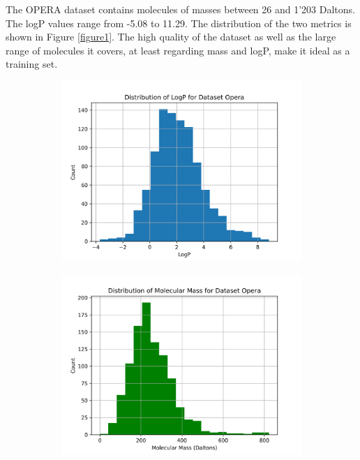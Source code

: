\documentclass{article}
\theoremstyle{definition}
\theoremstyle{remark}
\begin{document}
The OPERA dataset contains molecules of masses between 26 and 1'203 Daltons. The logP values range from -5.08 to 11.29. The distribution of the two metrics is shown in Figure \ref{figure1}. The high quality of the dataset as well as the large range of molecules it covers, at least regarding mass and logP, make it ideal as a training set.\\

\begin{figure}
\captionsetup[subfigure]{justification=Centering}

\begin{subfigure}[t]{0.45\textwidth}
    \includegraphics[width=\textwidth]{./../plots/logp_distribution_Opera.png}
\end{subfigure}\hspace{\fill} %
\begin{subfigure}[t]{0.45\textwidth}
    \includegraphics[width=\linewidth]{./../plots/molecular_mass_distribution_Opera.png}
\end{subfigure}


\end{figure}
\end{document}
